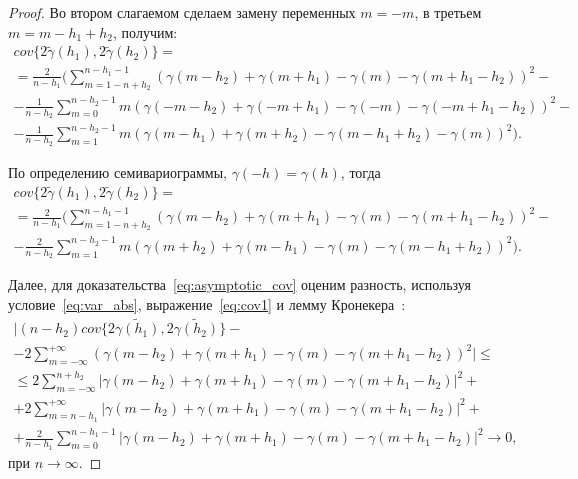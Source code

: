 \begin{proof}
Во втором слагаемом сделаем замену переменных $ m = -m $, в третьем $ m = m - h_1 + h_2 $, получим:
\begin{equation*}\begin{gathered}
	cov\{ 2 \tilde{\gamma}(h_1), 2 \tilde{\gamma}(h_2) \} = \\
	= \frac{2}{n - h_1} (\sum_{m = 1 - n + h_2}^{n - h_1 - 1} (\gamma(m - h_2) + \gamma(m + h_1) - \gamma(m) - \gamma(m + h_1 - h_2))^2 - \\
	- \frac{1}{n - h_2} \sum_{m = 0}^{n - h_2 - 1} m (\gamma(-m - h_2) + \gamma(-m + h_1) - \gamma(-m) - \gamma(-m + h_1 - h_2))^2 - \\
	- \frac{1}{n - h_2} \sum_{m = 1}^{n - h_2 - 1} m (\gamma(m - h_1) + \gamma(m + h_2) - \gamma(m - h_1 + h_2) - \gamma(m))^2).
\end{gathered}\end{equation*}

По определению семивариограммы, $ \gamma(-h) = \gamma(h) $, тогда
\begin{equation}\begin{gathered}
\label{eq:cov2}
	cov\{ 2 \tilde{\gamma}(h_1), 2 \tilde{\gamma}(h_2) \} = \\
	= \frac{2}{n - h_1} (\sum_{m = 1 - n + h_2}^{n - h_1 - 1} (\gamma(m - h_2) + \gamma(m + h_1) - \gamma(m) - \gamma(m + h_1 - h_2))^2 - \\
	- \frac{2}{n - h_2} \sum_{m = 1}^{n - h_2 - 1} m (\gamma(m + h_2) + \gamma(m - h_1) - \gamma(m) - \gamma(m - h_1 + h_2))^2).
\end{gathered}\end{equation}

Далее, для доказательства~\eqref{eq:asymptotic_cov} оценим разность, используя условие~\eqref{eq:var_abs}, выражение~\eqref{eq:cov1} и лемму Кронекера~\cite{shiryaev1980}:
\begin{equation}\begin{gathered}
\label{eq:asyfirst}
	\vert (n - h_2) cov \{ 2 \tilde{\gamma(h_1)}, 2 \tilde{\gamma(h_2)} \} - \\
	- 2 \sum_{m = -\infty}^{+ \infty} (\gamma(m - h_2) + \gamma(m + h_1) - \gamma(m) - \gamma(m + h_1 - h_2))^2 \vert \leq \\
	\leq 2 \sum_{m = -\infty}^{n + h_2} \vert \gamma(m - h_2) + \gamma(m + h_1) - \gamma(m) - \gamma(m + h_1 - h_2) \vert^2 + \\
	+ 2 \sum_{m = n - h_1}^{+ \infty} \vert \gamma(m - h_2) + \gamma(m + h_1) - \gamma(m) - \gamma(m + h_1 - h_2) \vert^2 + \\
	+ \frac{2}{n - h_1} \sum_{m = 0}^{n - h_1 - 1} \vert \gamma(m - h_2) + \gamma(m + h_1) - \gamma(m) - \gamma(m + h_1 - h_2) \vert^2 \to 0,
\end{gathered}\end{equation}
при $ n \to \infty$.


\end{proof}

